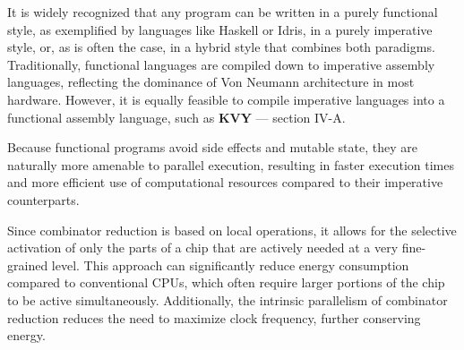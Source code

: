 \documentclass{IEEEtran}
\begin{document}

\par It is widely recognized that any program can be written in a purely functional style, as exemplified by languages like Haskell or Idris, in a purely imperative style, or, as is often the case, in a hybrid style that combines both paradigms. Traditionally, functional languages are compiled down to imperative assembly languages, reflecting the dominance of Von Neumann architecture in most hardware. However, it is equally feasible to compile imperative languages into a functional assembly language, such as \textbf{KVY} --- section IV-A.

\par Because functional programs avoid side effects and mutable state, they are naturally more amenable to parallel execution, resulting in faster execution times and more efficient use of computational resources compared to their imperative counterparts.

\par Since combinator reduction is based on local operations, it allows for the selective activation of only the parts of a chip that are actively needed at a very fine-grained level. This approach can significantly reduce energy consumption compared to conventional CPUs, which often require larger portions of the chip to be active simultaneously.
Additionally, the intrinsic parallelism of combinator reduction reduces the need to maximize clock frequency, further conserving energy.
\end{document}
